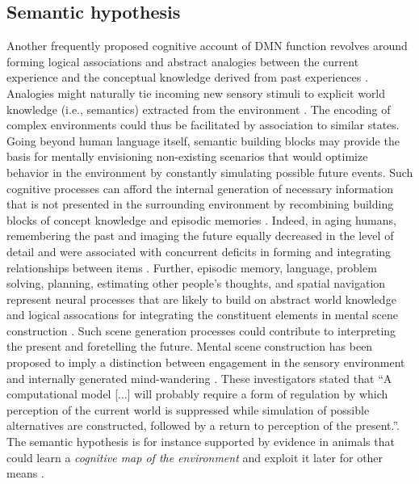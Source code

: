 \documentclass[10pt,letterpaper]{article}
\begin{document}
\subsection{Semantic hypothesis}
Another frequently proposed cognitive account of DMN function revolves
around forming logical associations and abstract analogies between
the current experience and
the conceptual knowledge derived from past experiences
\citep{bar2007proactive, binder1999conceptual, constantinescu2016organizing}.
Analogies might naturally tie incoming new sensory stimuli to
explicit world knowledge (i.e., semantics) extracted from the environment
\citep{bar2009proactive}.
The encoding of complex environments could thus be facilitated
by association to similar states.
%
Going beyond human language itself,
semantic building blocks may provide the basis for
mentally envisioning non-existing scenarios
that would optimize behavior in the environment
by constantly simulating possible future events.
Such cognitive processes can afford
the internal generation of necessary information
that is not presented in the surrounding environment
by recombining building blocks of
concept knowledge and episodic memories
\citep{hassabis2009construction}.
Indeed, in aging humans, remembering the past and imaging the future
equally decreased in the level of detail and were associated with
concurrent deficits in forming and integrating relationships between
items \citep{addis2008age, spreng2006temporal}.
Further,
episodic memory, language, problem solving,
planning, estimating other people's thoughts, and spatial navigation
represent neural processes that are likely to
build on abstract world knowledge and logical assocations
for integrating the constituent elements in mental scene construction
\citep{schacter2007remembering}.
Such scene generation processes could contribute to interpreting the
present and foretelling the future.
Mental scene construction has been proposed
to imply a distinction between
engagement in the sensory environment
and internally generated mind-wandering
\citep{buckner2007self}.
These investigators stated that
``A computational model [...] will probably require a form of
regulation by which perception of the current world is suppressed
while simulation of possible alternatives are constructed,
followed by a return to perception of the present.''.
The semantic hypothesis is for instance supported by evidence in animals that
could learn a \textit{cognitive map of the environment}
and exploit it later for other means \citep{tolman1948cognitive}.
\end{document}
